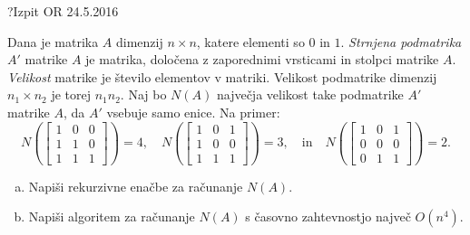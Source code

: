 \begin{naloga}{?}{Izpit OR 24.5.2016}
\begin{vprasanje}
Dana je matrika $A$ dimenzij $n \times n$, katere elementi so $0$ in $1$.
{\em Strnjena podmatrika} $A'$ matrike $A$ je matrika,
določena z zaporednimi vrsticami in stolpci matrike $A$.
{\em Velikost} matrike je število elementov v matriki.
Velikost podmatrike dimenzij $n_1 \times n_2$ je torej $n_1 n_2$.
Naj bo $N(A)$ največja velikost take podmatrike $A'$ matrike $A$,
da $A'$ vsebuje samo enice.
Na primer:
$$
N\left(\begin{bmatrix}
1 & 0 & 0 \\
1 & 1 & 0 \\
1 & 1 & 1
\end{bmatrix}\right) = 4, \quad
N\left(\begin{bmatrix}
1 & 0 & 1 \\
1 & 0 & 0 \\
1 & 1 & 1
\end{bmatrix}\right) = 3, \quad \text{in} \quad
N\left(\begin{bmatrix}
1 & 0 & 1 \\
0 & 0 & 0 \\
0 & 1 & 1
\end{bmatrix}\right) = 2.
$$

\begin{enumerate}[(a)]
\item Napiši rekurzivne enačbe za računanje $N(A)$.

\item Napiši algoritem za računanje $N(A)$
s časovno zahtevnostjo največ $O(n^4)$.
\end{enumerate}
\end{vprasanje}
\begin{odgovor}
\end{odgovor}
\end{naloga}
